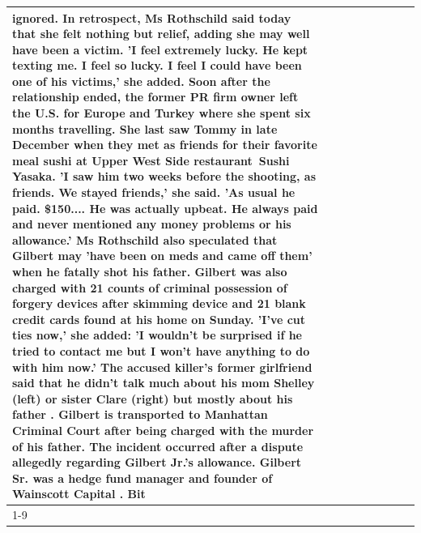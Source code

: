\begin{table}[H]
\begin{tabular}{lllrlllll}
ignored. In retrospect, Ms Rothschild said today that she felt nothing but relief, adding she may well have been a victim. 'I feel extremely lucky. He kept texting me. I feel so lucky. I feel I could have been one of his victims,' she added. Soon after the relationship ended, the former PR firm owner left the U.S. for Europe and Turkey where she spent six months  travelling. She last saw Tommy in late December when they met as friends for their favorite meal sushi at Upper West Side restaurant Sushi Yasaka. 'I saw him two weeks before the shooting, as friends. We stayed friends,' she said. 'As usual he paid. \$150.... He was actually upbeat. He always paid and never mentioned any money problems or his allowance.' Ms Rothschild also speculated that Gilbert may 'have been on meds and came off them' when he fatally shot his father. Gilbert was also charged with 21 counts of criminal possession of forgery devices after skimming device and 21 blank credit cards found at his home on Sunday. 'I've cut ties now,' she added: 'I wouldn’t be surprised if he tried to contact me but I won’t have anything to do with him now.' The accused killer's former girlfriend said that he didn't talk much about his mom Shelley (left) or sister Clare (right) but mostly about his father . Gilbert is transported to Manhattan Criminal Court  after being charged with the murder of his father. The incident occurred after a dispute allegedly regarding Gilbert Jr.'s allowance. Gilbert Sr. was a hedge fund manager and founder of Wainscott Capital . Bit \\
\cline{1-9}

\end{tabular}
\end{table}

